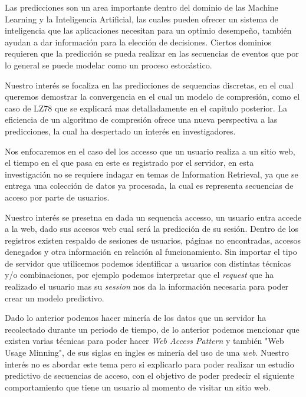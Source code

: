




Las predicciones son un area importante dentro del dominio de las Machine Learning y la Inteligencia Artificial, las cuales pueden ofrecer un sistema de inteligencia que las aplicaciones necesitan para un optimio desempeño, también ayudan a dar información para la elección de decisiones. Ciertos dominios requieren que la predicción se pueda realizar en las secuencias de eventos que por lo general se puede modelar como un proceso estocástico. 

Nuestro interés se focaliza en las predicciones de sequencias discretas, en el cual queremos demostrar la convergencia en el cual un modelo de compresión, como el caso de LZ78 que se explicará mas detalladamente en el capitulo posterior. La eficiencia de un algoritmo de compresión ofrece una nueva perspectiva a las predicciones, la cual ha despertado un interés en investigadores.

Nos enfocaremos en el caso del los accesso que un usuario realiza a un sitio web, el tiempo en el que pasa en este es registrado por el servidor, en esta investigación no se requiere indagar en temas de Information Retrieval, ya que se entrega una colección de datos ya procesada, la cual es representa secuencias de acceso por parte de usuarios.




Nuestro interés se presetna en dada un sequencia accesso, un usuario entra accede a la web, dado sus accesos web cual será la predicción de su sesión.  Dentro de los registros existen respaldo de sesiones de usuarios, páginas no encontradas, accesos denegados y otra información en relación al funcionamiento. Sin importar el tipo de servidor que utilicemos podemos identificar a usuarios con distintas técnicas y/o combinaciones, por ejemplo podemos interpretar que el \emph{request} que ha realizado el usuario mas su \emph{session} nos da la información necesaria para poder crear un modelo predictivo.

Dado lo anterior podemos hacer minería de los datos que un servidor ha recolectado durante un periodo de tiempo, de lo anterior  podemos mencionar que existen varias técnicas para poder hacer \emph{Web Access Pattern } y también  "Web Usage Minning", de sus siglas en ingles es minería del uso de una \emph{web}. Nuestro interés no es abordar este tema pero si explicarlo para poder realizar un estudio predictivo de secuencias de acceso, con el objetivo de poder predecir el siguiente comportamiento que tiene un usuario al momento de visitar un sitio web.


